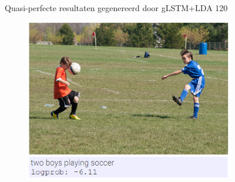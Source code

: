 \begin{figure}
\begin{subfigure}{.5\textwidth}
			\label{fig:perfectresults4}
		\end{subfigure}				
		
		\caption{Quasi-perfecte resultaten gegenereerd door gLSTM+LDA 120}
		\label{fig:perfectresults}
	\end{figure}
	
		\begin{figure}
			\begin{subfigure}{.5\textwidth}
				\centering
				\includegraphics[width=.8\linewidth]{Images/Results/Perfect/playing_soccer}
				\label{fig:perfectresults5}
			\end{subfigure}%
			\begin{subfigure}{.5\textwidth}
				\centering
				\label{fig:perfectresults6}
			\end{subfigure}
			\\
			\begin{subfigure}{.5\textwidth}
				\centering

\end{subfigure}
\end{figure}
